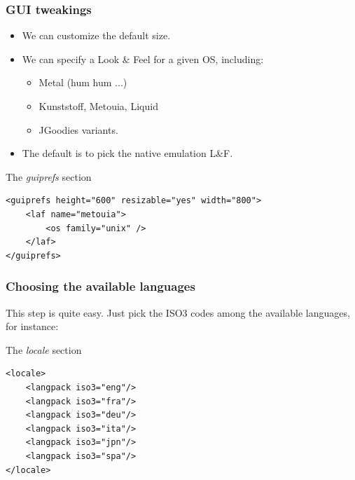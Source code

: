 \documentclass[compress,10pt]{beamer}
\begin{document}
\begin{frame}[containsverbatim]

\frametitle{GUI tweakings}

\begin{itemize}

  \item We can customize the default size.

  \item We can specify a Look \& Feel for a given OS, including:
    \begin{itemize}
      \item Metal (hum hum ...)
      \item Kunststoff, Metouia, Liquid
      \item JGoodies variants.
    \end{itemize}

  \item The default is to pick the native emulation L\&F.

\end{itemize}

\begin{block}{The \textsl{guiprefs} section}
\tiny
\begin{verbatim}
<guiprefs height="600" resizable="yes" width="800">
    <laf name="metouia">
        <os family="unix" />
    </laf>
</guiprefs>
\end{verbatim}
\end{block}

\end{frame}


\begin{frame}[containsverbatim]

\frametitle{Choosing the available languages}

This step is quite easy. Just pick the ISO3 codes among the available languages,
for instance:

\begin{block}{The \textsl{locale} section}
\tiny
\begin{verbatim}
<locale>
    <langpack iso3="eng"/>
    <langpack iso3="fra"/>
    <langpack iso3="deu"/>
    <langpack iso3="ita"/>
    <langpack iso3="jpn"/>
    <langpack iso3="spa"/>
</locale>
\end{verbatim}
\end{block}

\end{frame}
\end{document}
